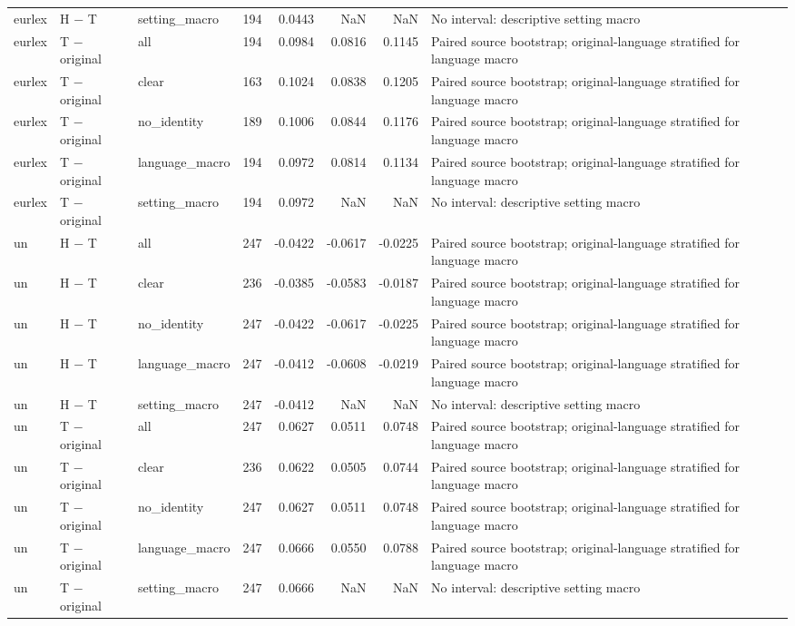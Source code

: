 \begin{tabular}{lllrrrrl}
eurlex & H − T & setting\_macro & 194 & 0.0443 & NaN & NaN & No interval: descriptive setting macro \\
eurlex & T − original & all & 194 & 0.0984 & 0.0816 & 0.1145 & Paired source bootstrap; original-language stratified for language macro \\
eurlex & T − original & clear & 163 & 0.1024 & 0.0838 & 0.1205 & Paired source bootstrap; original-language stratified for language macro \\
eurlex & T − original & no\_identity & 189 & 0.1006 & 0.0844 & 0.1176 & Paired source bootstrap; original-language stratified for language macro \\
eurlex & T − original & language\_macro & 194 & 0.0972 & 0.0814 & 0.1134 & Paired source bootstrap; original-language stratified for language macro \\
eurlex & T − original & setting\_macro & 194 & 0.0972 & NaN & NaN & No interval: descriptive setting macro \\
un & H − T & all & 247 & -0.0422 & -0.0617 & -0.0225 & Paired source bootstrap; original-language stratified for language macro \\
un & H − T & clear & 236 & -0.0385 & -0.0583 & -0.0187 & Paired source bootstrap; original-language stratified for language macro \\
un & H − T & no\_identity & 247 & -0.0422 & -0.0617 & -0.0225 & Paired source bootstrap; original-language stratified for language macro \\
un & H − T & language\_macro & 247 & -0.0412 & -0.0608 & -0.0219 & Paired source bootstrap; original-language stratified for language macro \\
un & H − T & setting\_macro & 247 & -0.0412 & NaN & NaN & No interval: descriptive setting macro \\
un & T − original & all & 247 & 0.0627 & 0.0511 & 0.0748 & Paired source bootstrap; original-language stratified for language macro \\
un & T − original & clear & 236 & 0.0622 & 0.0505 & 0.0744 & Paired source bootstrap; original-language stratified for language macro \\
un & T − original & no\_identity & 247 & 0.0627 & 0.0511 & 0.0748 & Paired source bootstrap; original-language stratified for language macro \\
un & T − original & language\_macro & 247 & 0.0666 & 0.0550 & 0.0788 & Paired source bootstrap; original-language stratified for language macro \\
un & T − original & setting\_macro & 247 & 0.0666 & NaN & NaN & No interval: descriptive setting macro \\
\bottomrule
\end{tabular}
